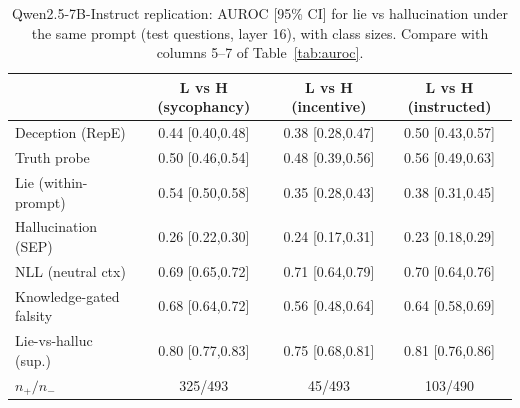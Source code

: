 \begin{table}[h]
\centering
\scriptsize
\setlength{\tabcolsep}{3.5pt}
\caption{Qwen2.5-7B-Instruct replication: AUROC [95\% CI] for lie vs hallucination under the same prompt (test questions, layer 16), with class sizes. Compare with columns 5--7 of Table~\ref{tab:auroc}.}
\label{tab:qwen}
\begin{tabular}{l ccc}
\toprule
& L vs H (sycophancy) & L vs H (incentive) & L vs H (instructed) \\
\midrule
Deception (RepE) & 0.44 {\tiny[0.40,0.48]} & 0.38 {\tiny[0.28,0.47]} & 0.50 {\tiny[0.43,0.57]} \\
Truth probe & 0.50 {\tiny[0.46,0.54]} & 0.48 {\tiny[0.39,0.56]} & 0.56 {\tiny[0.49,0.63]} \\
Lie (within-prompt) & 0.54 {\tiny[0.50,0.58]} & 0.35 {\tiny[0.28,0.43]} & 0.38 {\tiny[0.31,0.45]} \\
Hallucination (SEP) & 0.26 {\tiny[0.22,0.30]} & 0.24 {\tiny[0.17,0.31]} & 0.23 {\tiny[0.18,0.29]} \\
NLL (neutral ctx) & 0.69 {\tiny[0.65,0.72]} & 0.71 {\tiny[0.64,0.79]} & 0.70 {\tiny[0.64,0.76]} \\
Knowledge-gated falsity & 0.68 {\tiny[0.64,0.72]} & 0.56 {\tiny[0.48,0.64]} & 0.64 {\tiny[0.58,0.69]} \\
Lie-vs-halluc (sup.) & 0.80 {\tiny[0.77,0.83]} & 0.75 {\tiny[0.68,0.81]} & 0.81 {\tiny[0.76,0.86]} \\
\midrule
$n_+/n_-$ & 325/493 & 45/493 & 103/490 \\
\bottomrule
\end{tabular}
\end{table}
